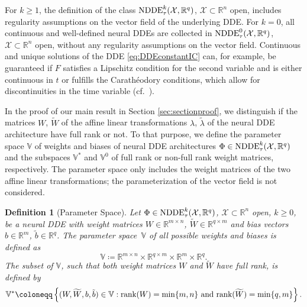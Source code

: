 \documentclass[10pt]{article}
\numberwithin{equation}{section}
\newtheorem{definition}[theorem]{Definition}
\begin{document}
	For $k\geq 1$, the definition of the class $\textup{NDDE}^k_\tau(\mathcal{X},\mathbb{R}^q)$, $\mathcal{X}\subset \mathbb{R}^n$ open, includes regularity assumptions on the vector field of the underlying DDE. For $k = 0$, all continuous and well-defined neural DDEs are collected in $\textup{NDDE}^0_\tau(\mathcal{X},\mathbb{R}^q)$, $\mathcal{X}\subset \mathbb{R}^n$ open, without any regularity assumptions on the vector field. Continuous and unique solutions of the DDE \eqref{eq:DDEconstantIC} can, for example, be guaranteed if $F$ satisfies a Lipschitz condition for the second variable and is either continuous in $t$ or fulfills the Carathéodory conditions, which allow for discontinuities in the time variable  (cf.\ \cite{Hale1993}).
	
	
	In the proof of our main result in Section \ref{sec:sectionproof}, we distinguish if the matrices $W$, $\widetilde{W}$ of the affine linear transformations $\lambda$, $\tilde \lambda$ of the neural DDE architecture have full rank or not. To that purpose, we define the parameter space $\mathbb{V}$ of weights and biases of neural DDE architectures $\Phi \in \textup{NDDE}^k_\tau(\mathcal{X},\mathbb{R}^q)$ and the subspaces $\mathbb{V}^\ast$ and $\mathbb{V}^0$ of full rank or non-full rank weight matrices, respectively. The parameter space only includes the weight matrices of the two affine linear transformations; the parameterization of the vector field is not considered.
	
	\begin{definition}[Parameter Space]\label{def:DDEweightspace}
		Let $\Phi\in \textup{NDDE}^k_\tau(\mathcal{X},\mathbb{R}^q)$, $\mathcal{X}\subset \mathbb{R}^n$ open, $k \geq 0$, be a neural DDE with weight matrices $W\in \mathbb{R}^{m \times n}$, $\widetilde{W}\in\mathbb{R}^{q \times m}$ and bias vectors $b \in \mathbb{R}^m$, $\tilde{b}\in \mathbb{R}^q$. The parameter space~$\mathbb{V}$ of all possible weights and biases is defined as
		\begin{equation*}
			\mathbb{V}\coloneqq \mathbb{R}^{m \times n} \times \mathbb{R}^{q \times m} \times \mathbb{R}^m \times \mathbb{R}^q. 
		\end{equation*}
		The subset of $\mathbb{V}$, such that both weight matrices $W$ and $\widetilde{W}$ have full rank, is defined by 
		\begin{equation*}
			\mathbb{V}^\ast \coloneqq \left\{(W,\widetilde{W},b,\tilde{b}) \in \mathbb{V}: \textup{rank}(W) = \min\{m,n\} \text{ and } \textup{rank}(\widetilde{W}) = \min\{q,m\} \right\}.
		\end{equation*}
	\end{definition}
	
\end{document}
